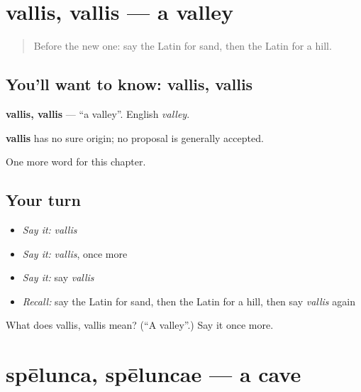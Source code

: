 \section[vallis, vallis]{vallis, vallis — a valley}

\label{lesson:LA-C88-vallis}



\begin{quote}
Before the new one: say the Latin for sand, then the Latin for a hill.
\end{quote}

\subsection*{You'll want to know: vallis, vallis}
\textbf{vallis, vallis} — \textquotedblleft{}a valley\textquotedblright{}. English \emph{valley}.

\begin{cousinweb}
\textbf{vallis} has no sure origin; no proposal is generally accepted.
\end{cousinweb}

\begin{grammarlens}[title={What you've built}]
One more word for this chapter.
\end{grammarlens}

\subsection*{Your turn}
\begin{itemize}
\raggedright
  \item \emph{Say it:} \emph{vallis}
  \item \emph{Say it:} \emph{vallis}, once more
  \item \emph{Say it:} say \emph{vallis}
  \item \emph{Recall:} say the Latin for sand, then the Latin for a hill, then say \emph{vallis} again
\end{itemize}

\begin{tcolorbox}[breakable,colback=teal!4,colframe=teal!35!black,title={Before you move on}]
What does vallis, vallis mean? (\textquotedblleft{}A valley\textquotedblright{}.) Say it once more.
\end{tcolorbox}
\section[spēlunca, spēluncae]{spēlunca, spēluncae — a cave}

